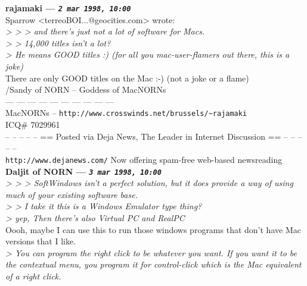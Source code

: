\documentclass[11pt,twoside,a4paper]{article}
\begin{document}
\begin{multicols*}{2}
 
		
	
		
\textbf{rajamaki --- \emph{\texttt{2 mar 1998, 10:00}}}~\\

Sparrow <terreoBOI...@geocities.com> wrote:~\\
\emph{> > > and there's just not a lot of software for Macs.}~\\

\emph{> > 14,000 titles isn't a lot?}~\\

\emph{> He means GOOD titles :) (for all you mac-user-flamers out there, this is a joke)}~\\

There are only GOOD titles on the Mac :-) (not a joke or a flame)~\\

/Sandy of NORN -- Goddess of MacNORNs~\\
--- --- --- --- --- --- --- --- --- ---~\\
MacNORNs -- \texttt{http://www.crosswinds.net/brussels/\textasciitilde rajamaki}~\\
ICQ\# 7029961~\\

-- -- -- -- -- == Posted via Deja News, The Leader in Internet Discussion == -- -- -- -- -- ~\\
\texttt{http://www.dejanews.com/}   Now offering spam-free web-based newsreading~\\

 
		
	
		
\textbf{Daljit of NORN --- \emph{\texttt{3 mar 1998, 10:00}}}~\\

\emph{> >  > SoftWindows isn't a perfect solution, but it does provide a way of using much of your existing software base.}~\\

\emph{> >  I take it this is a Windows Emulator type thing?}~\\

\emph{> yep, Then there's also Virtual PC and RealPC}~\\

Oooh, maybe I can use this to run those windows programs that don't have Mac versions that I like.~\\

\emph{> You can program the right click to be whatever you want. If you want it to be the contextual menu, you program it for control-click which is the Mac equivalent of a right click.}~\\


\end{multicols*}
\end{document}
